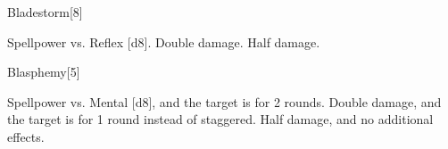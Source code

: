 \begin{spellsection}{Bladestorm}[8]
    \begin{spellheader}
    \end{spellheader}
    \begin{spellcontent}
        \begin{spelltargetinginfo}
        \end{spelltargetinginfo}
        \begin{spelleffects}
            \begin{spellattack}{Spellpower vs. Reflex}
                \spellsuccess {}[d8].
                \spellcritical Double damage.
                \spellfailure Half damage.
            \end{spellattack}
        \end{spelleffects}
    \end{spellcontent}
    \begin{spellfooter}
        \miscastexplode
    \end{spellfooter}
\end{spellsection}

\begin{spellsection}{Blasphemy}[5]
    \begin{spellheader}
    \end{spellheader}
    \begin{spellcontent}
        \begin{spelltargetinginfo}
        \end{spelltargetinginfo}
        \begin{spelleffects}
            \begin{spellattack}{Spellpower vs. Mental}
                \spellsuccess {}[d8], and the target is \staggered for 2 rounds.
                \spellcritical Double damage, and the target is \nauseated for 1 round instead of staggered.
                \spellfailure Half damage, and no additional effects.
            \end{spellattack}
        \end{spelleffects}
    \end{spellcontent}
    \begin{spellfooter}
        \miscastexplode
    \end{spellfooter}
\end{spellsection}

